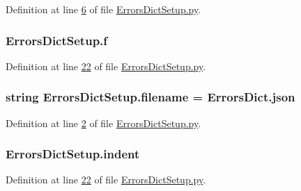 Definition at line \hyperlink{_errors_dict_setup_8py_source_l00006}{6} of file \hyperlink{_errors_dict_setup_8py_source}{Errors\+Dict\+Setup.\+py}.

\subsubsection[{\texorpdfstring{f}{f}}]{\setlength{\rightskip}{0pt plus 5cm}Errors\+Dict\+Setup.\+f}\hypertarget{namespace_errors_dict_setup_aadfab4e19ca2acd086062511d8ec75a8}{}\label{namespace_errors_dict_setup_aadfab4e19ca2acd086062511d8ec75a8}


Definition at line \hyperlink{_errors_dict_setup_8py_source_l00022}{22} of file \hyperlink{_errors_dict_setup_8py_source}{Errors\+Dict\+Setup.\+py}.

\subsubsection[{\texorpdfstring{filename}{filename}}]{\setlength{\rightskip}{0pt plus 5cm}string Errors\+Dict\+Setup.\+filename = \textquotesingle{}Errors\+Dict.\+json\textquotesingle{}}\hypertarget{namespace_errors_dict_setup_a0c97c48fca0fdec3e730b9df1dbab9c7}{}\label{namespace_errors_dict_setup_a0c97c48fca0fdec3e730b9df1dbab9c7}


Definition at line \hyperlink{_errors_dict_setup_8py_source_l00002}{2} of file \hyperlink{_errors_dict_setup_8py_source}{Errors\+Dict\+Setup.\+py}.

\subsubsection[{\texorpdfstring{indent}{indent}}]{\setlength{\rightskip}{0pt plus 5cm}Errors\+Dict\+Setup.\+indent}\hypertarget{namespace_errors_dict_setup_a3c8f88b66a58f9c28e5d3bd66fa6191a}{}\label{namespace_errors_dict_setup_a3c8f88b66a58f9c28e5d3bd66fa6191a}


Definition at line \hyperlink{_errors_dict_setup_8py_source_l00022}{22} of file \hyperlink{_errors_dict_setup_8py_source}{Errors\+Dict\+Setup.\+py}.

